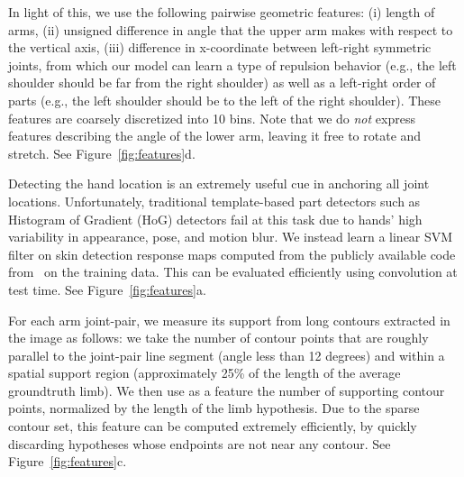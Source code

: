 In light of this, we use the following pairwise geometric features: (i) length 
of arms, (ii) unsigned difference in angle that the upper arm makes with 
respect to the vertical axis, (iii) difference in x-coordinate between 
left-right symmetric joints, from which our model can learn a type of repulsion 
behavior (e.g., the left shoulder should be far from the right shoulder) as 
well as a left-right order of parts (e.g., the left shoulder should be to the 
left of the right shoulder).  These features are coarsely discretized into 10 
bins.  Note that we do {\em not} express features describing the angle of the 
lower arm, leaving it free to rotate and stretch. See 
Figure~\ref{fig:features}d. 

  Detecting the hand location is an extremely 
useful cue in anchoring all joint locations.  Unfortunately, traditional 
template-based part detectors such as Histogram of Gradient (HoG) detectors fail at this task due to 
hands' high variability in appearance, pose, and motion blur.  We instead learn 
a linear SVM filter on skin detection response maps computed from the publicly 
available code from~\cite{sapp10cascades} on the training data.  This can be 
evaluated efficiently using convolution at test time.  See 
Figure~\ref{fig:features}a.


  For each arm joint-pair, we measure 
its support from long contours extracted in the image as follows: we take the 
number of contour points that are roughly parallel to the joint-pair line 
segment (angle less than 12 degrees) and within a spatial support region 
(approximately 25\% of the length of the average groundtruth limb).  We then 
use as a feature the number of supporting contour points, normalized by the 
length of the limb hypothesis.  Due to the sparse contour set, 
this feature can be computed extremely efficiently, by quickly discarding 
hypotheses whose endpoints are not near any contour. See Figure~\ref{fig:features}c.


